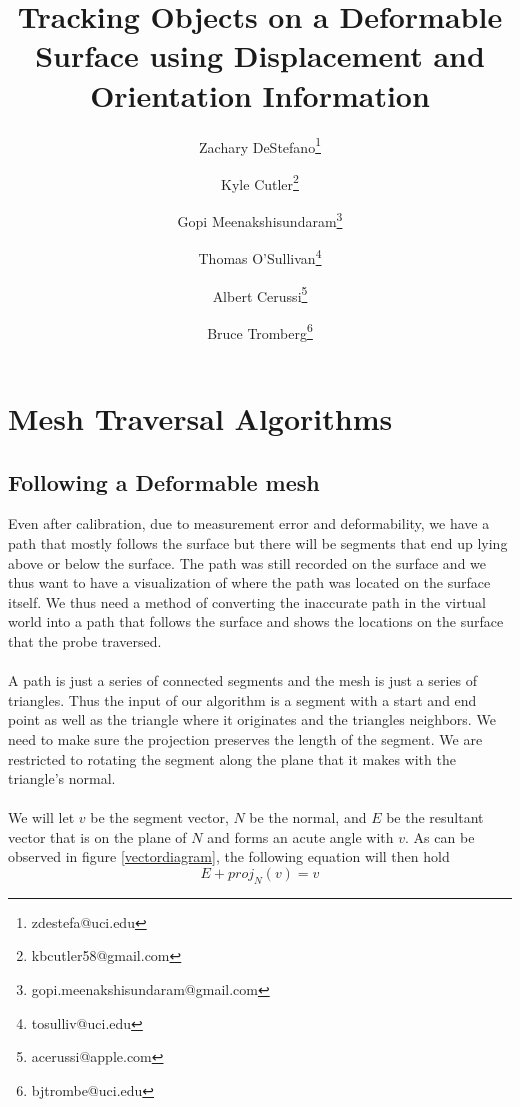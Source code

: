 \documentclass[conference]{acmsiggraph}
\title{Tracking Objects on a Deformable Surface using Displacement and Orientation Information}
\author[1]{Zachary DeStefano\thanks{zdestefa@uci.edu}}
\author[1]{Kyle Cutler\thanks{kbcutler58@gmail.com}}
\author[1]{Gopi Meenakshisundaram\thanks{gopi.meenakshisundaram@gmail.com}}
\author[1]{Thomas O'Sullivan\thanks{tosulliv@uci.edu}}
\author[1]{Albert Cerussi\thanks{acerussi@apple.com}}
\author[1]{Bruce Tromberg\thanks{bjtrombe@uci.edu}}
\affil[1]{University of California, Irvine}
\begin{document}

\maketitle



\section{Mesh Traversal Algorithms}

\subsection{Following a Deformable mesh}

Even after calibration, due to measurement error and deformability, we have a path that mostly follows the surface but there will be segments that end up lying above or below the surface. The path was still recorded on the surface and we thus want to have a visualization of where the path was located on the surface itself. We thus need a method of converting the inaccurate path in the virtual world into a path that follows the surface and shows the locations on the surface that the probe traversed. \\
\\
A path is just a series of connected segments and the mesh is just a series of triangles. Thus the input of our algorithm is a segment with a start and end point as well as the triangle where it originates and the triangles neighbors. We need to make sure the projection preserves the length of the segment. We are restricted to rotating the segment along the plane that it makes with the triangle's normal. \\
\\
We will let $v$ be the segment vector, $N$ be the normal, and $E$ be the resultant vector that is on the plane of $N$ and forms an acute angle with $v$. As can be observed in figure \ref{vectordiagram}, the following equation will then hold
\[
E + proj_N(v) = v
\]
\end{document}
